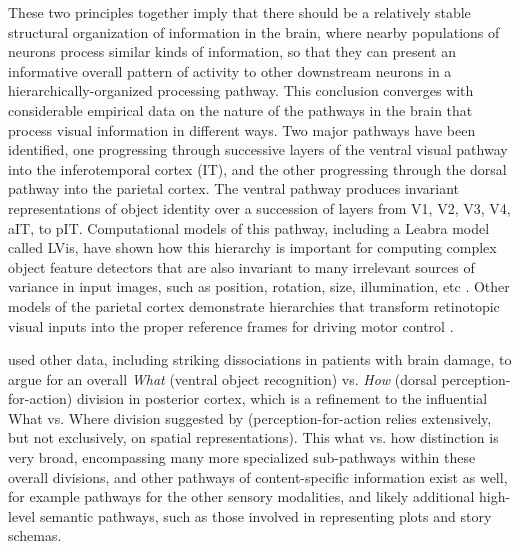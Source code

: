 \documentclass[11pt,twoside]{article}
\begin{document}
These two principles together imply that there should be a relatively stable
structural organization of information in the brain, where nearby populations
of neurons process similar kinds of information, so that they can present an
informative overall pattern of activity to other downstream neurons in a
hierarchically-organized processing pathway.  This conclusion converges with
considerable empirical data on the nature of the pathways in the brain that
process visual information in different ways.  Two major pathways have been
identified, one progressing through successive layers of the ventral visual
pathway into the inferotemporal cortex (IT), and the other progressing through
the dorsal pathway into the parietal cortex.  The ventral pathway produces
invariant representations of object identity over a succession of layers from
V1, V2, V3, V4, aIT, to pIT.  Computational models of this pathway, including
a Leabra model called LVis, have shown how this hierarchy is important
for computing complex object feature detectors that are also invariant to many
irrelevant sources of variance in input images, such as position, rotation,
size, illumination, etc \cite{OReillyEtAlIP,Fukushima80,Fukushima03,WallisRolls97,RiesenhuberPoggio99,SerreWolfBileschiEtAl07,MutchLowe08}.  Other models of
the parietal cortex demonstrate hierarchies that transform retinotopic visual
inputs into the proper reference frames for driving motor control
\cite{PougetSejnowski97,PougetDeneveDuhamel02}.

 used other data,
including striking dissociations in patients with brain damage, to argue for
an overall {\em What} (ventral object recognition) vs. {\em How} (dorsal
perception-for-action) division in posterior cortex, which is a refinement to
the influential What vs. Where division suggested by
 (perception-for-action relies extensively, but
not exclusively, on spatial representations).  This what vs. how distinction
is very broad, encompassing many more specialized sub-pathways within these
overall divisions, and other pathways of content-specific information exist as
well, for example pathways for the other sensory modalities, and likely
additional high-level semantic pathways, such as those involved in
representing plots and story schemas.
\end{document}
